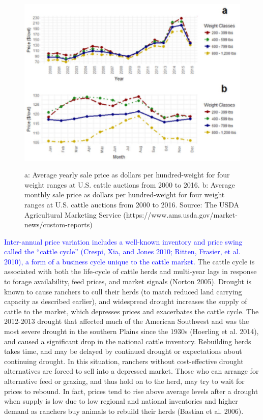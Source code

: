 \documentclass[11pt]{article}
\begin{document}
\begin{figure}
\includegraphics[scale=1]{prices}
\label{prices}
\caption{a: Average yearly sale price as dollars per hundred-weight for four weight ranges at U.S. cattle auctions from 2000 to 2016. b: Average monthly sale price as dollars per hundred-weight for four weight ranges at U.S. cattle auctions from 2000 to 2016. Source: The USDA Agricultural Marketing Service (https://www.ams.usda.gov/market-news/custom-reports)}
\end{figure}

\textcolor{blue}{Inter-annual price variation includes a well-known inventory and price swing called the ``cattle cycle'' (Crespi, Xia, and Jones 2010; Ritten, Frasier, et al. 2010), a form of a business cycle unique to the cattle market.}
The cattle cycle is associated with both the life-cycle of cattle herds and multi-year lags in response to forage availability, feed prices, and market signals (Norton 2005).
Drought is known to cause ranchers to cull their herds (to match reduced land carrying capacity as described earlier), and widespread drought increases the supply of cattle to the market, which depresses prices and exacerbates the cattle cycle. The 2012-2013 drought that affected much of the American Southwest and was the most severe drought in the southern Plains since the 1930s (Hoerling et al. 2014), and caused a significant drop in the national cattle inventory. Rebuilding herds takes time, and may be delayed by continued drought or expectations about continuing drought. In this situation, ranchers without cost-effective drought alternatives are forced to sell into a depressed market. Those who can arrange for alternative feed or grazing, and thus hold on to the herd, may try to wait for prices to rebound. In fact, prices tend to rise above average levels after a drought when supply is low due to low regional and national inventories and higher demand as ranchers buy animals to rebuild their herds (Bastian et al. 2006).
\end{document}
